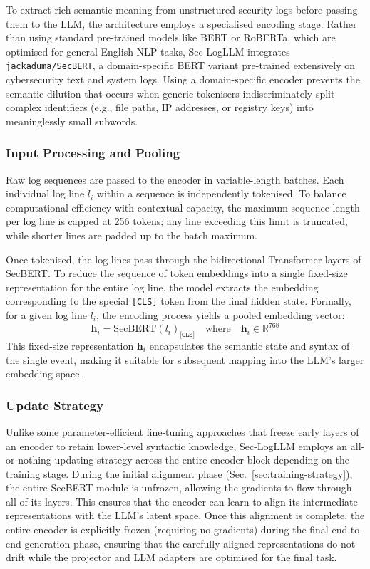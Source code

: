 To extract rich semantic meaning from unstructured security logs before passing them to the LLM, the architecture employs a specialised encoding stage. Rather than using standard pre-trained models like BERT or RoBERTa, which are optimised for general English NLP tasks, Sec-LogLLM integrates \texttt{jackaduma/SecBERT}, a domain-specific BERT variant pre-trained extensively on cybersecurity text and system logs. Using a domain-specific encoder prevents the semantic dilution that occurs when generic tokenisers indiscriminately split complex identifiers (e.g., file paths, IP addresses, or registry keys) into meaninglessly small subwords.

\subsubsection{Input Processing and Pooling}

Raw log sequences are passed to the encoder in variable-length batches. Each individual log line $l_{i}$ within a sequence is independently tokenised. To balance computational efficiency with contextual capacity, the maximum sequence length per log line is capped at 256 tokens; any line exceeding this limit is truncated, while shorter lines are padded up to the batch maximum. 

Once tokenised, the log lines pass through the bidirectional Transformer layers of SecBERT. To reduce the sequence of token embeddings into a single fixed-size representation for the entire log line, the model extracts the embedding corresponding to the special \texttt{[CLS]} token from the final hidden state. Formally, for a given log line $l_i$, the encoding process yields a pooled embedding vector:
\begin{equation}\label{eq:encoder-pooling}
    \mathbf{h}_i = \text{SecBERT}(l_i)_{\texttt{[CLS]}} \quad \text{where} \quad \mathbf{h}_i \in \mathbb{R}^{768}
\end{equation}
This fixed-size representation $\mathbf{h}_i$ encapsulates the semantic state and syntax of the single event, making it suitable for subsequent mapping into the LLM's larger embedding space. 

\subsubsection{Update Strategy}

Unlike some parameter-efficient fine-tuning approaches that freeze early layers of an encoder to retain lower-level syntactic knowledge, Sec-LogLLM employs an all-or-nothing updating strategy across the entire encoder block depending on the training stage. During the initial alignment phase (Sec.~\ref{sec:training-strategy}), the entire SecBERT module is unfrozen, allowing the gradients to flow through all of its layers. This ensures that the encoder can learn to align its intermediate representations with the LLM's latent space. Once this alignment is complete, the entire encoder is explicitly frozen (requiring no gradients) during the final end-to-end generation phase, ensuring that the carefully aligned representations do not drift while the projector and LLM adapters are optimised for the final task.

